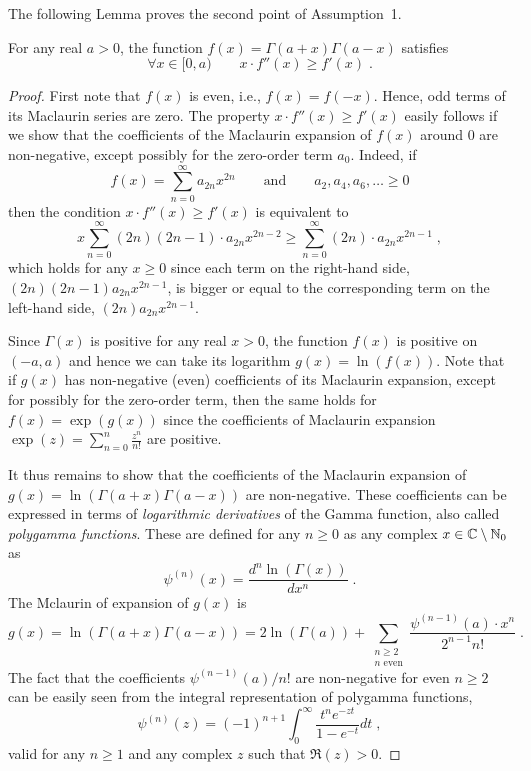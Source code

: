 The following Lemma proves the second point of Assumption~1.
\begin{lemma}
\label{lemma:gamma-function}
For any real $a > 0$, the function $f(x) = \Gamma(a+x) \Gamma(a-x)$ satisfies
$$
\forall x \in [0, a) \qquad x \cdot f''(x) \ge f'(x) \; .
$$
\end{lemma}
\begin{proof}
First note that $f(x)$ is even, i.e., $f(x) = f(-x)$. Hence, odd terms of its
Maclaurin series are zero. The property $x \cdot f''(x) \ge f'(x)$ easily
follows if we show that the coefficients of the Maclaurin expansion of $f(x)$
around $0$ are non-negative, except possibly for the zero-order term $a_0$.
Indeed, if
$$
f(x) = \sum_{n=0}^\infty a_{2n} x^{2n} \qquad \text{and} \qquad a_2, a_4, a_6, \dots \ge 0
$$
then the condition $x \cdot f''(x) \ge f'(x)$ is equivalent to
$$
x \sum_{n=0}^\infty (2n)(2n-1) \cdot a_{2n} x^{2n-2} \ge \sum_{n=0}^\infty (2n) \cdot a_{2n} x^{2n-1} \; ,
$$
which holds for any $x \ge 0$ since each term on the right-hand side,
$(2n)(2n-1) a_{2n} x^{2n-1}$, is bigger or equal to the corresponding term on
the left-hand side, $(2n) a_{2n} x^{2n-1}$.

Since $\Gamma(x)$ is positive for any real $x > 0$, the function $f(x)$ is
positive on $(-a,a)$ and hence we can take its logarithm $g(x) = \ln(f(x))$.
Note that if $g(x)$ has non-negative (even) coefficients of its Maclaurin
expansion, except for possibly for the zero-order term, then the same holds for
$f(x) = \exp(g(x))$ since the coefficients of Maclaurin expansion $\exp(z) =
\sum_{n=0}^n \frac{z^n}{n!}$ are positive.

It thus remains to show that the coefficients of the Maclaurin expansion of
$g(x) = \ln(\Gamma(a+x) \Gamma(a-x))$ are non-negative. These coefficients can
be expressed in terms of \emph{logarithmic derivatives} of the Gamma function,
also called \emph{polygamma functions}. These are defined for any $n \ge 0$ as
any complex $x \in \mathbb{C} \setminus \mathbb{N}_{0}$ as
$$
\psi^{(n)}(x) = \frac{d^n\ln(\Gamma(x))}{dx^n} \; .
$$
The Mclaurin of expansion of $g(x)$ is
$$
g(x)
= \ln \left( \Gamma(a+x) \Gamma(a-x) \right)
= 2 \ln(\Gamma(a)) + \sum_{\substack{n \ge 2 \\ \text{$n$ even}}} \frac{\psi^{(n-1)}(a) \cdot x^n}{2^{n-1} n!} \; .
$$
The fact that the coefficients $\psi^{(n-1)}(a)/n!$ are non-negative for even $n
\ge 2$ can be easily seen from the integral representation of polygamma
functions,
$$
\psi^{(n)}(z) = (-1)^{n+1} \int_0^\infty \frac{t^n e^{-zt}}{1-e^{-t}} dt \; ,
$$
valid for any $n \ge 1$ and any complex $z$ such that $\Re(z) > 0$.
\end{proof}

